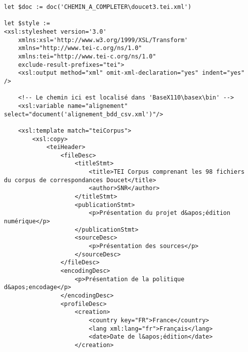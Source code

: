 \begin{verbatim}
let $doc := doc('CHEMIN_A_COMPLETER\doucet3.tei.xml')

let $style := 
<xsl:stylesheet version='3.0'
    xmlns:xsl='http://www.w3.org/1999/XSL/Transform'
    xmlns="http://www.tei-c.org/ns/1.0"
    xmlns:tei="http://www.tei-c.org/ns/1.0"
    exclude-result-prefixes="tei">       
    <xsl:output method="xml" omit-xml-declaration="yes" indent="yes" />
    
    <!-- Le chemin ici est localisé dans 'BaseX110\basex\bin' -->
    <xsl:variable name="alignement" select="document('alignement_bdd_csv.xml')"/>

    <xsl:template match="teiCorpus">
        <xsl:copy>
            <teiHeader>
                <fileDesc>
                    <titleStmt>
                        <title>TEI Corpus comprenant les 98 fichiers du corpus de correspondances Doucet</title>
                        <author>SNR</author>
                    </titleStmt>
                    <publicationStmt>
                        <p>Présentation du projet d&apos;édition numérique</p>
                    </publicationStmt>
                    <sourceDesc>
                        <p>Présentation des sources</p>
                    </sourceDesc>
                </fileDesc>
                <encodingDesc>
                    <p>Présentation de la politique d&apos;encodage</p>
                </encodingDesc>
                <profileDesc>
                    <creation>
                        <country key="FR">France</country>
                        <lang xml:lang="fr">Français</lang>
                        <date>Date de l&apos;édition</date>
                    </creation>
                    

\end{verbatim}
